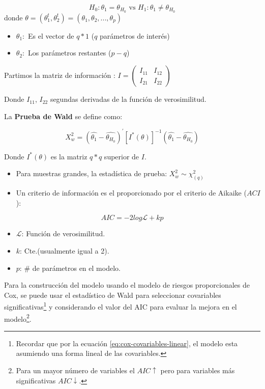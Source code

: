 \documentclass[
  a4paper,
  oneside,
  openany]{book}
\providecommand{\tightlist}{%
  \setlength{\itemsep}{0pt}\setlength{\parskip}{0pt}}
\begin{document}
\[H_0:\theta_1 = \theta_{H_0}\mbox{ vs }H_1:\theta_1\neq \theta_{H_0}\]
donde \(\theta = (\theta_1^t, \theta_2^t) = (\theta_1, \theta_2, ..., \theta_p)\)

\begin{itemize}
\tightlist
\item
  \(\theta_1:\) Es el vector de \(q*1\) (\(q\) parámetros de interés)
\item
  \(\theta_2:\) Los parámetros restantes (\(p-q\))
\end{itemize}

Partimos la matriz de información : \(I = \begin{pmatrix}I_{11} & I_{12} \\ I_{21} & I_{22}\end{pmatrix}\)

Donde \(I_{11}\), \(I_{22}\) segundas derivadas de la función de verosimilitud.

La \textbf{Prueba de Wald} se define como:

\[
X_w^2 =(\hat{\theta_1}-\hat{\theta_{H_0}})^{'}[I^{*}(\theta)]^{-1}(\hat{\theta_1}-\hat{\theta_{H_0}})
\]

Donde \(I^{*}(\theta)\) es la matriz \(q*q\) superior de \(I\).

\begin{itemize}
\item
  Para muestras grandes, la estadística de prueba: \(X_w^2\sim\chi_{(q)}^2\)
\item
  Un criterio de información es el proporcionado por el criterio de Aikaike (\(ACI\)):
\end{itemize}

\[AIC  = -2log{\mathscr{L}}+kp\]

\begin{itemize}
\tightlist
\item
  \(\mathscr{L}\): Función de verosimilitud.
\item
  \(k\): Cte.(usualmente igual a 2).
\item
  \(p\): \# de parámetros en el modelo.
\end{itemize}

Para la construcción del modelo usando el modelo de riesgos proporcionales de Cox, se puede usar el estadístico de Wald para seleccionar covariables significativas\footnote{Recordar que por la ecuación \eqref{eq:cox-covariables-linear}, el modelo esta asumiendo una forma lineal de las covariables.} y considerando el valor del AIC para evaluar la mejora en el modelo\footnote{Para un mayor número de variables el \(AIC\uparrow\) pero para variables más significativas \(AIC\downarrow\).}.
\end{document}
